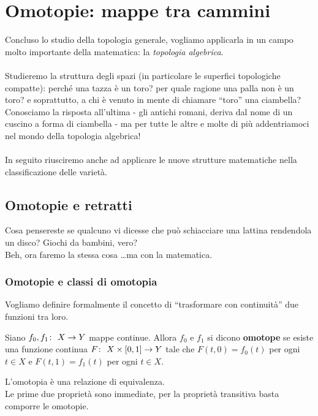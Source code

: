 \chapter{Omotopie: mappe tra cammini}
Concluso lo studio della topologia generale, vogliamo applicarla in un campo molto importante della matematica: la \textit{topologia algebrica}. \\ \\ Studieremo la struttura degli spazi (in particolare le superfici topologiche compatte): perché una tazza è un toro? per quale ragione una palla non è un toro? e soprattutto, a chi è venuto in mente di chiamare \enquote{toro} una ciambella?\\ Conosciamo la risposta all'ultima - gli antichi romani, deriva dal nome di un cuscino a forma di ciambella - ma per tutte le altre e molte di più addentriamoci nel mondo della topologia algebrica! \\ \\ In seguito riusciremo anche ad applicare le nuove strutture matematiche nella classificazione delle varietà.



\newpage
\section{Omotopie e retratti}
Cosa pensereste se qualcuno vi dicesse che può schiacciare una lattina rendendola un disco? Giochi da bambini, vero? \\ Beh, ora faremo la stessa cosa \dots ma con la matematica.
\subsection{\textcolor{TopAlg}{\textbf{Omotopie e classi di omotopia}}}
Vogliamo definire formalmente il concetto di \enquote{trasformare con continuità} due funzioni tra loro.

\begin{definition}
	Siano $f_0, f_1 \colon\ X \rightarrow Y$ mappe continue. Allora $f_0$ e $f_1$ si dicono \textbf{omotope} se esiste una funzione continua $F \colon\ X \times \left[0,1\right] \rightarrow Y$ tale che $F(t,0) = f_0(t)$ per ogni $t \in X$ e $F(t,1) = f_1(t)$ per ogni $t \in X$.
\end{definition}

\begin{remark}
	L'omotopia è una relazione di equivalenza.\\ Le prime due proprietà sono immediate, per la proprietà transitiva basta comporre le omotopie.
\end{remark}

